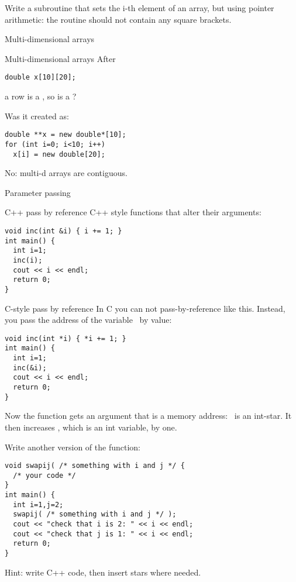 \begin{exercise}
  Write a subroutine that sets the i-th element of an array, but using
  pointer arithmetic: the routine should not contain any square brackets.
\end{exercise}

 {Multi-dimensional arrays}

\begin{block}{Multi-dimensional arrays}
  \label{sl:static-multi}
After
\begin{lstlisting}
double x[10][20];
\end{lstlisting}
a row  is a , so is  a ?

Was it created as:
\begin{lstlisting}
double **x = new double*[10];
for (int i=0; i<10; i++)
  x[i] = new double[20];
\end{lstlisting}
No: multi-d arrays are contiguous.
\end{block}

 {Parameter passing}

\begin{block}{C++ pass by reference}
  \label{sl:cpp-pass-ref}
  C++ style functions that alter their arguments:
\begin{lstlisting}
void inc(int &i) { i += 1; }
int main() {
  int i=1;
  inc(i);
  cout << i << endl;
  return 0;
}
\end{lstlisting}
\end{block}

\begin{block}{C-style pass by reference}
  \label{sl:c-pass-ref}
  In C you can not pass-by-reference like this. Instead, you pass the
  address of the variable~ by value:
\begin{lstlisting}
void inc(int *i) { *i += 1; }
int main() {
  int i=1;
  inc(&i);
  cout << i << endl;
  return 0;
}
\end{lstlisting}
Now the function gets an argument that is a memory address: ~is
an int-star. It then increases , which is an int variable, by one.
\end{block}

\begin{exercise}
  \label{ex:c-star-swap}
  Write another version of the  function:
\begin{lstlisting}
void swapij( /* something with i and j */ {
  /* your code */
}
int main() {
  int i=1,j=2;
  swapij( /* something with i and j */ );
  cout << "check that i is 2: " << i << endl;
  cout << "check that j is 1: " << i << endl;
  return 0;
}
\end{lstlisting}
Hint: write C++ code, then insert stars where needed.
\end{exercise}

